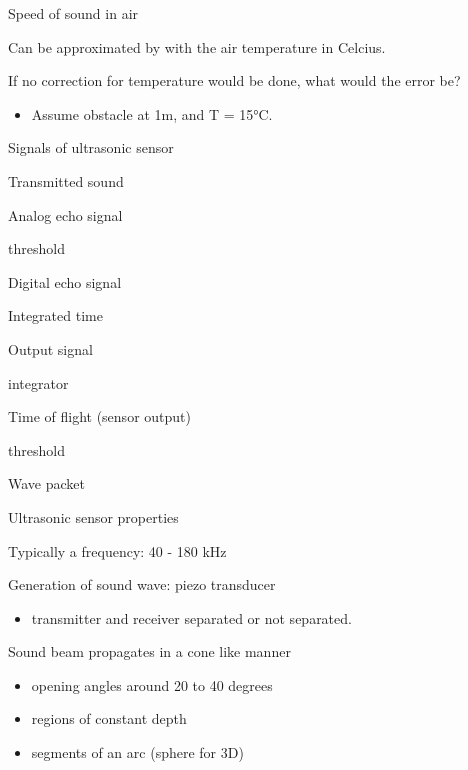 \documentclass[compress]{beamer}
\begin{document}
\begin{frame}{Speed of sound in air}

Can be approximated by with the air temperature in Celcius.

If no correction for temperature would be done, what would the error be?

\begin{itemize}

\item
  Assume obstacle at 1m, and T = 15°C.
\end{itemize}

\end{frame}

\begin{frame}{Signals of ultrasonic sensor}

Transmitted sound

Analog echo signal

threshold

Digital echo signal

Integrated time

Output signal

integrator

Time of flight (sensor output)

threshold

Wave packet

\end{frame}

\begin{frame}{Ultrasonic sensor properties}

Typically a frequency: 40 - 180 kHz

Generation of sound wave: piezo transducer

\begin{itemize}

\item
  transmitter and receiver separated or not separated.
\end{itemize}

Sound beam propagates in a cone like manner

\begin{itemize}

\item
  opening angles around 20 to 40 degrees
\item
  regions of constant depth
\item
  segments of an arc (sphere for 3D)
\end{itemize}

\end{frame}
\end{document}
